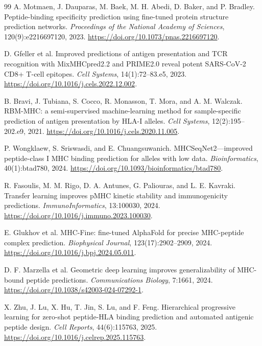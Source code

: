 \begin{thebibliography}{99}
A. Motmaen, J. Dauparas, M. Baek, M. H. Abedi, D. Baker, and P. Bradley.
\newblock Peptide-binding specificity prediction using fine-tuned protein structure prediction networks.
\newblock \emph{Proceedings of the National Academy of Sciences}, 120(9):e2216697120, 2023.
\newblock \url{https://doi.org/10.1073/pnas.2216697120}.

D. Gfeller et al.
\newblock Improved predictions of antigen presentation and TCR recognition with MixMHCpred2.2 and PRIME2.0 reveal potent SARS-CoV-2 CD8+ T-cell epitopes.
\newblock \emph{Cell Systems}, 14(1):72--83.e5, 2023.
\newblock \url{https://doi.org/10.1016/j.cels.2022.12.002}.

B. Bravi, J. Tubiana, S. Cocco, R. Monasson, T. Mora, and A. M. Walczak.
\newblock RBM-MHC: a semi-supervised machine-learning method for sample-specific prediction of antigen presentation by HLA-I alleles.
\newblock \emph{Cell Systems}, 12(2):195--202.e9, 2021.
\newblock \url{https://doi.org/10.1016/j.cels.2020.11.005}.

P. Wongklaew, S. Sriswasdi, and E. Chuangsuwanich.
\newblock MHCSeqNet2---improved peptide-class I MHC binding prediction for alleles with low data.
\newblock \emph{Bioinformatics}, 40(1):btad780, 2024.
\newblock \url{https://doi.org/10.1093/bioinformatics/btad780}.

R. Fasoulis, M. M. Rigo, D. A. Antunes, G. Paliouras, and L. E. Kavraki.
\newblock Transfer learning improves pMHC kinetic stability and immunogenicity predictions.
\newblock \emph{ImmunoInformatics}, 13:100030, 2024.
\newblock \url{https://doi.org/10.1016/j.immuno.2023.100030}.

E. Glukhov et al.
\newblock MHC-Fine: fine-tuned AlphaFold for precise MHC-peptide complex prediction.
\newblock \emph{Biophysical Journal}, 123(17):2902--2909, 2024.
\newblock \url{https://doi.org/10.1016/j.bpj.2024.05.011}.

D. F. Marzella et al.
\newblock Geometric deep learning improves generalizability of MHC-bound peptide predictions.
\newblock \emph{Communications Biology}, 7:1661, 2024.
\newblock \url{https://doi.org/10.1038/s42003-024-07292-1}.

X. Zhu, J. Lu, X. Hu, T. Jin, S. Lu, and F. Feng.
\newblock Hierarchical progressive learning for zero-shot peptide-HLA binding prediction and automated antigenic peptide design.
\newblock \emph{Cell Reports}, 44(6):115763, 2025.
\newblock \url{https://doi.org/10.1016/j.celrep.2025.115763}.


\end{thebibliography}
